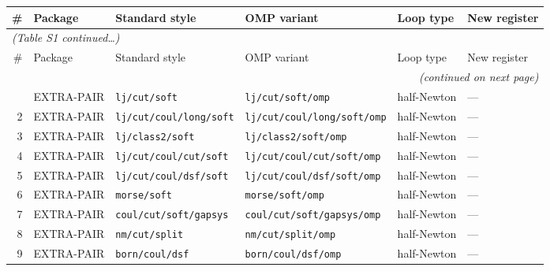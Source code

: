 \documentclass[
  11pt,
]{article}
\renewcommand{\arraystretch}{1.15}
\begin{document}
\begin{landscape}
\begingroup
\small
\setlength{\tabcolsep}{5pt}
\renewcommand{\arraystretch}{1.18}
\begin{longtable}{r l p{4.8cm} p{5.4cm} l p{3.2cm}}
\toprule
\# & Package & Standard style & OMP variant & Loop type & New register \\
\midrule
\endfirsthead
\multicolumn{6}{l}{\small\itshape (Table S1 continued\ldots)}\\[2pt]
\toprule
\# & Package & Standard style & OMP variant & Loop type & New register \\
\midrule
\endhead
\midrule
\multicolumn{6}{r}{\small\itshape (continued on next page)}\\
\endfoot
\bottomrule
\endlastfoot
 1 & EXTRA-PAIR & \nolinkurl{lj/cut/soft}                  & \nolinkurl{lj/cut/soft/omp}                  & half-Newton      & ---                  \\
 2 & EXTRA-PAIR & \nolinkurl{lj/cut/coul/long/soft}         & \nolinkurl{lj/cut/coul/long/soft/omp}         & half-Newton      & ---                  \\
 3 & EXTRA-PAIR & \nolinkurl{lj/class2/soft}                & \nolinkurl{lj/class2/soft/omp}                & half-Newton      & ---                  \\
 4 & EXTRA-PAIR & \nolinkurl{lj/cut/coul/cut/soft}          & \nolinkurl{lj/cut/coul/cut/soft/omp}          & half-Newton      & ---                  \\
 5 & EXTRA-PAIR & \nolinkurl{lj/cut/coul/dsf/soft}          & \nolinkurl{lj/cut/coul/dsf/soft/omp}          & half-Newton      & ---                  \\
 6 & EXTRA-PAIR & \nolinkurl{morse/soft}                    & \nolinkurl{morse/soft/omp}                    & half-Newton      & ---                  \\
 7 & EXTRA-PAIR & \nolinkurl{coul/cut/soft/gapsys}          & \nolinkurl{coul/cut/soft/gapsys/omp}          & half-Newton      & ---                  \\
 8 & EXTRA-PAIR & \nolinkurl{nm/cut/split}                  & \nolinkurl{nm/cut/split/omp}                  & half-Newton      & ---                  \\
 9 & EXTRA-PAIR & \nolinkurl{born/coul/dsf}                 & \nolinkurl{born/coul/dsf/omp}                 & half-Newton      & ---                  \\

\end{longtable}
\end{landscape}
\end{document}
